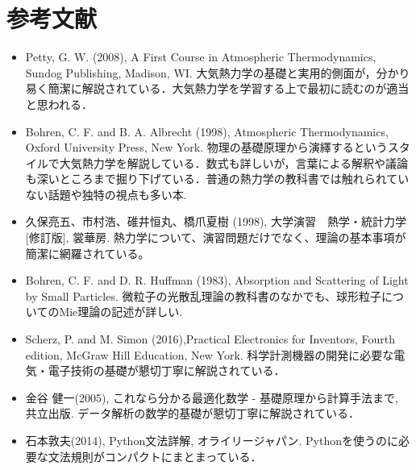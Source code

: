 \documentclass{jsarticle}
\begin{document}
\section{参考文献}
\begin{itemize}
\item Petty, G. W. (2008), A First Course in Atmospheric Thermodynamics, Sundog Publishing, Madison, WI.
大気熱力学の基礎と実用的側面が，分かり易く簡潔に解説されている．大気熱力学を学習する上で最初に読むのが適当と思われる．
\item Bohren, C. F. and B. A. Albrecht (1998), Atmospheric Thermodynamics, Oxford University Press, New York.
物理の基礎原理から演繹するというスタイルで大気熱力学を解説している．数式も詳しいが，言葉による解釈や議論も深いところまで掘り下げている．普通の熱力学の教科書では触れられていない話題や独特の視点も多い本. 
\item 久保亮五、市村浩、碓井恒丸、橋爪夏樹 (1998), 大学演習　熱学・統計力学　[修訂版], 裳華房.
熱力学について、演習問題だけでなく、理論の基本事項が簡潔に網羅されている。
\item Bohren, C. F. and D. R. Huffman (1983), Absorption and Scattering of Light by Small Particles.
微粒子の光散乱理論の教科書のなかでも、球形粒子についてのMie理論の記述が詳しい. 
\item Scherz, P. and M. Simon (2016),Practical Electronics for Inventors, Fourth edition, McGraw Hill Education, New York.
科学計測機器の開発に必要な電気・電子技術の基礎が懇切丁寧に解説されている．
\item 金谷 健一(2005), これなら分かる最適化数学 - 基礎原理から計算手法まで, 共立出版.
データ解析の数学的基礎が懇切丁寧に解説されている．
\item 石本敦夫(2014), Python文法詳解, オライリージャパン.
Pythonを使うのに必要な文法規則がコンパクトにまとまっている．
\end{itemize}
\end{document}
